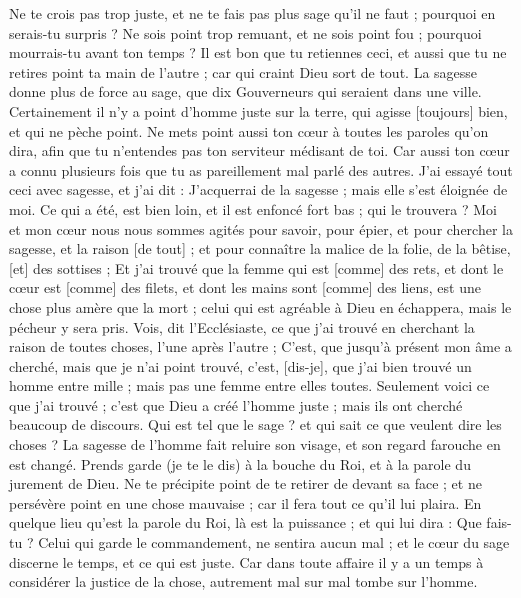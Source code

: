 \begin{multicols}{2}
Ne te crois pas trop juste, et ne te fais pas plus sage qu'il ne faut ; pourquoi en serais-tu surpris ?
Ne sois point trop remuant, et ne sois point fou ; pourquoi mourrais-tu avant ton temps ?
Il est bon que tu retiennes ceci, et aussi que tu ne retires point ta main de l'autre ; car qui craint Dieu sort de tout.
La sagesse donne plus de force au sage, que dix Gouverneurs qui seraient dans une ville.
Certainement il n'y a point d'homme juste sur la terre, qui agisse [toujours] bien, et qui ne pèche point.
Ne mets point aussi ton cœur à toutes les paroles qu'on dira, afin que tu n'entendes pas ton serviteur médisant de toi.
Car aussi ton cœur a connu plusieurs fois que tu as pareillement mal parlé des autres.
J'ai essayé tout ceci avec sagesse, et j'ai dit : J'acquerrai de la sagesse ; mais elle s'est éloignée de moi.
Ce qui a été, est bien loin, et il est enfoncé fort bas ; qui le trouvera ?
Moi et mon cœur nous nous sommes agités pour savoir, pour épier, et pour chercher la sagesse, et la raison [de tout] ; et pour connaître la malice de la folie, de la bêtise, [et] des sottises ;
Et j'ai trouvé que la femme qui est [comme] des rets, et dont le cœur est [comme] des filets, et dont les mains sont [comme] des liens, est une chose plus amère que la mort ; celui qui est agréable à Dieu en échappera, mais le pécheur y sera pris.
Vois, dit l'Ecclésiaste, ce que j'ai trouvé en cherchant la raison de toutes choses, l'une après l'autre ;
C'est, que jusqu'à présent mon âme a cherché, mais que je n'ai point trouvé, c'est, [dis-je], que j'ai bien trouvé un homme entre mille ; mais pas une femme entre elles toutes.
Seulement voici ce que j'ai trouvé ; c'est que Dieu a créé l'homme juste ; mais ils ont cherché beaucoup de discours.
\VerseOne{}Qui est tel que le sage ? et qui sait ce que veulent dire les choses ? La sagesse de l'homme fait reluire son visage, et son regard farouche en est changé.
Prends garde (je te le dis) à la bouche du Roi, et à la parole du jurement de Dieu.
Ne te précipite point de te retirer de devant sa face ; et ne persévère point en une chose mauvaise ; car il fera tout ce qu'il lui plaira.
En quelque lieu qu'est la parole du Roi, là est la puissance ; et qui lui dira : Que fais-tu ?
Celui qui garde le commandement, ne sentira aucun mal ; et le cœur du sage discerne le temps, et ce qui est juste.
Car dans toute affaire il y a un temps à considérer la justice de la chose, autrement mal sur mal tombe sur l'homme.

\end{multicols}

